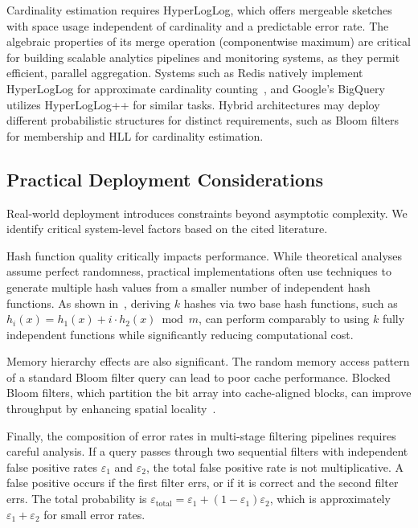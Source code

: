 Cardinality estimation requires HyperLogLog, which offers mergeable sketches with space usage independent of cardinality and a predictable error rate. The algebraic properties of its merge operation (componentwise maximum) are critical for building scalable analytics pipelines and monitoring systems, as they permit efficient, parallel aggregation. Systems such as Redis natively implement HyperLogLog for approximate cardinality counting~\cite{redis-hll}, and Google's BigQuery utilizes HyperLogLog++ for similar tasks. Hybrid architectures may deploy different probabilistic structures for distinct requirements, such as Bloom filters for membership and HLL for cardinality estimation.

\subsection{Practical Deployment Considerations}

Real-world deployment introduces constraints beyond asymptotic complexity. We identify critical system-level factors based on the cited literature.

Hash function quality critically impacts performance. While theoretical analyses assume perfect randomness, practical implementations often use techniques to generate multiple hash values from a smaller number of independent hash functions. As shown in~\cite{tarkoma2011theory}, deriving $k$ hashes via two base hash functions, such as $h_i(x) = h_1(x) + i \cdot h_2(x) \bmod m$, can perform comparably to using $k$ fully independent functions while significantly reducing computational cost.

Memory hierarchy effects are also significant. The random memory access pattern of a standard Bloom filter query can lead to poor cache performance. Blocked Bloom filters, which partition the bit array into cache-aligned blocks, can improve throughput by enhancing spatial locality~\cite{tarkoma2011theory}.

Finally, the composition of error rates in multi-stage filtering pipelines requires careful analysis. If a query passes through two sequential filters with independent false positive rates $\varepsilon_1$ and $\varepsilon_2$, the total false positive rate is not multiplicative. A false positive occurs if the first filter errs, or if it is correct and the second filter errs. The total probability is $\varepsilon_{\text{total}} = \varepsilon_1 + (1 - \varepsilon_1)\varepsilon_2$, which is approximately $\varepsilon_1 + \varepsilon_2$ for small error rates.
